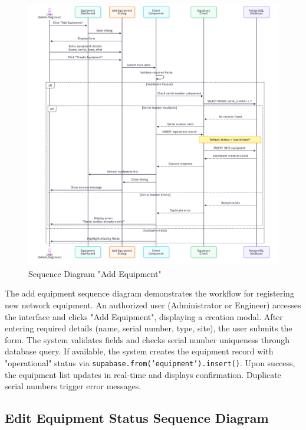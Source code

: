\begin{figure}[H]
    \centering
    \includegraphics[width=0.85\linewidth]{img/chap_04/add_equipment_sequence.png}
    \caption{Sequence Diagram "Add Equipment"}
    \label{fig:sequence_add_equipment}
\end{figure}

The add equipment sequence diagram demonstrates the workflow for registering new network equipment. An authorized user (Administrator or Engineer) accesses the interface and clicks "Add Equipment", displaying a creation modal. After entering required details (name, serial number, type, site), the user submits the form. The system validates fields and checks serial number uniqueness through database query. If available, the system creates the equipment record with "operational" status via \texttt{supabase.from('equipment').insert()}. Upon success, the equipment list updates in real-time and displays confirmation. Duplicate serial numbers trigger error messages.

\subsection{Edit Equipment Status Sequence Diagram}

